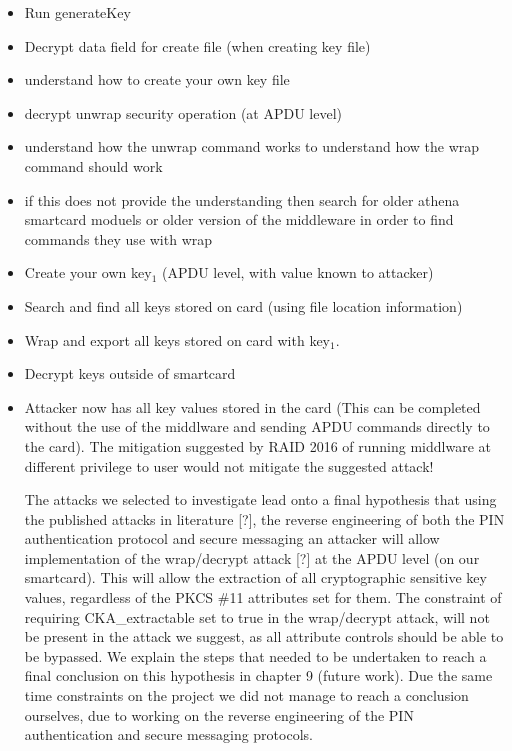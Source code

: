 \documentclass[bsc,frontabs,twoside,singlespacing,parskip,deptreport]{infthesis}     %
\begin{document}
\begin{itemize}
\item Run generateKey
\item Decrypt data field for create file (when creating key file)
\item understand how to create your own key file
\item decrypt unwrap security operation (at APDU level)
\item understand how the unwrap command works to understand how the wrap command should work
\item if this does not provide the understanding then search for older athena smartcard moduels or older version of the middleware in order to find commands they use with wrap
\item Create your own key$_1$ (APDU level, with value known to attacker)
\item Search and find all keys stored on card (using file location information)
\item Wrap and export all keys stored on card with key$_1$.
\item Decrypt keys outside of smartcard
\item Attacker now has all key values stored in the card (This can be completed without the use of the middlware and sending APDU commands directly to the card). The mitigation suggested by RAID 2016 of running middlware at different privilege to user would not mitigate the suggested attack!


The attacks we selected to investigate lead onto a final hypothesis that using the published attacks in literature [?], the reverse engineering of both the PIN authentication protocol and secure messaging an attacker will allow implementation of the wrap/decrypt attack [?] at the APDU level (on our smartcard). This will allow the extraction of all cryptographic sensitive key values, regardless of the PKCS \#11 attributes set for them. The constraint of requiring CKA\_extractable set to true in the wrap/decrypt attack, will not be present in the attack we suggest, as all attribute controls should be able to be bypassed. We explain the steps that needed to be undertaken to reach a final conclusion on this hypothesis in chapter 9 (future work). Due the same time constraints on the project we did not manage to reach a conclusion ourselves, due to working on the reverse engineering of the PIN authentication and secure messaging protocols.

\end{itemize}
\end{document}
